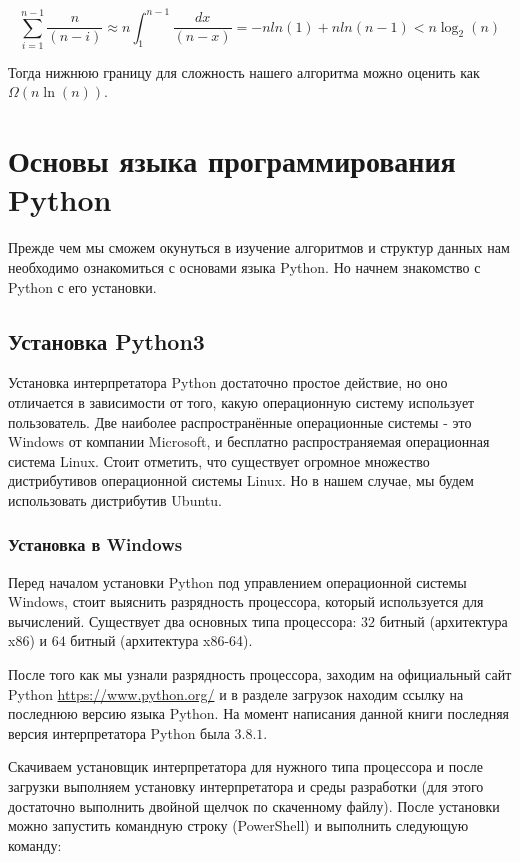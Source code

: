 $$\sum_{i=1}^{n-1}\frac{n}{(n-i)} \approx n\int_1^{n-1}\frac{dx}{(n-x)} = -nln(1)+nln(n-1) < n\log_2(n)$$

Тогда нижнюю границу для сложность нашего алгоритма можно оценить как $\Omega(n\ln(n))$.

\chapter{Основы языка программирования Python}

Прежде чем мы сможем окунуться в изучение алгоритмов и структур данных
нам необходимо ознакомиться с основами языка Python. Но начнем знакомство 
с Python с его установки.

\section{Установка Python3}

Установка интерпретатора Python достаточно простое действие, но оно отличается
в зависимости от того, какую операционную систему использует пользователь. 
Две наиболее распространённые операционные системы - это Windows от 
компании Microsoft, и бесплатно распространяемая операционная система 
Linux. Стоит отметить, что существует огромное множество дистрибутивов 
операционной системы Linux. Но в нашем случае, мы будем использовать 
дистрибутив Ubuntu.

\subsection{Установка в Windows}

Перед началом установки Python под управлением операционной системы
Windows, стоит выяснить разрядность процессора, который используется
для вычислений. Существует два основных типа процессора: $32$ битный 
(архитектура x86) и $64$ битный (архитектура x86-64).

После того как мы узнали разрядность процессора, заходим на официальный 
сайт Python \url{https://www.python.org/} и в разделе загрузок 
находим ссылку на последнюю версию языка Python. На момент написания 
данной книги последняя версия интерпретатора Python была $3.8.1$.

Скачиваем установщик интерпретатора для нужного типа процессора и после 
загрузки выполняем установку интерпретатора и среды разработки (для этого 
достаточно выполнить двойной щелчок по скаченному файлу). После установки
можно запустить командную строку (PowerShell) и выполнить следующую команду:

